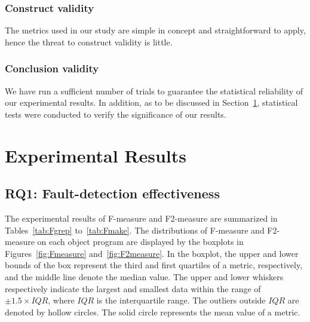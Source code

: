 \documentclass[10pt,journal,compsoc]{IEEEtran}
\begin{document}
\subsubsection{Construct validity}
The metrics used in our study are simple in concept and straightforward to apply, hence the threat to construct validity is little.

\subsubsection{Conclusion validity}
We have run a sufficient number of trials to guarantee the statistical reliability of our experimental results. In addition, as to be discussed in Section~\ref{sec:results}, statistical tests were conducted to verify the significance of our results.

\section{Experimental Results}
\label{sec:results}

\subsection{RQ1: Fault-detection effectiveness}

The experimental results of F-measure and F2-measure are summarized in Tables~\ref{tab:Fgrep} to~\ref{tab:Fmake}. The distributions of F-measure and F2-measure on each object program are displayed by the boxplots in Figures~\ref{fig:Fmeasure} and~\ref{fig:F2measure}. In the boxplot, the upper and lower bounds of the box represent the third and first quartiles of a metric, respectively, and the middle line denote the median value. The upper and lower whiskers respectively indicate the largest and smallest data within the range of $\pm 1.5 \times IQR$, where $IQR$ is the interquartile range. The outliers outside $IQR$ are denoted by hollow circles. The solid circle represents the mean value of a metric.
\end{document}
